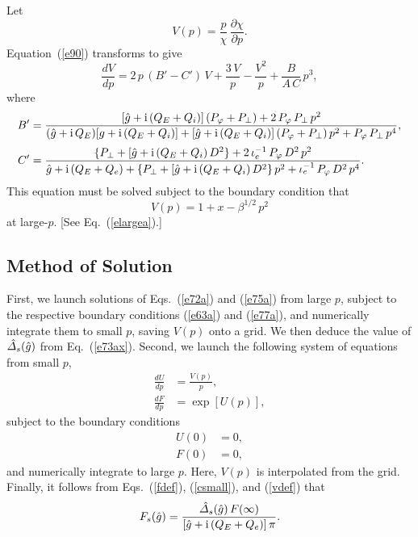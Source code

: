 \documentclass[12pt,prb,aps]{revtex4-1}
\begin{document}
Let 
\begin{equation}\label{vdef}
V(p)= \frac{p}{\chi}\,\frac{\partial\chi}{\partial p}.
\end{equation}
Equation~(\ref{e90}) transforms to give 
\begin{equation}\label{e75a}
\frac{dV}{dp} = 2\,p\,(B'-C')\,V + \frac{3\,V}{p} - \frac{V^2}{p} + \frac{B}{A\,C}\,p^3,
\end{equation}
where 
\begin{align}
B' &= \frac{ [\hat{g}+{\rm i}\,(Q_E+Q_i)]\,(P_\varphi+P_\perp)+ 2\,P_\varphi\,P_\perp\,p^2}{ (\hat{g}+{\rm i}\,Q_E)[g+{\rm i}\,(Q_E+Q_i)] + [\hat{g}+{\rm i}\,(Q_E+Q_i)]\,(P_\varphi+P_\perp)\,p^2+ P_\varphi\,P_\perp\,p^4},\\[0.5ex]
C'&=\frac{\{P_\perp + [\hat{g}+{\rm i}\,(Q_E+Q_i)\,D^2\}+ 2\,\iota_e^{-1}\,P_\varphi\,D^2\,p^2}{\hat{g} + {\rm i}\,(Q_E+Q_e) +\{P_\perp + [\hat{g}+{\rm i}\,(Q_E+Q_i)\,D^2\}\,p^2 + \iota_e^{-1}\,P_\varphi\,D^2\,p^4}.
\end{align}
This equation must be solved subject to the boundary condition that
\begin{equation}\label{e77a}
V(p) = 1+x-\beta^{1/2}\,p^2
\end{equation}
at large-$p$. [See Eq.~(\ref{elargea}).] 

\subsection{Method of Solution}
First, we launch solutions of Eqs.~(\ref{e72a}) and (\ref{e75a}) from large $p$, subject to the respective boundary conditions (\ref{e63a}) and (\ref{e77a}), and
numerically integrate them to small $p$,  saving $V(p)$ onto a grid. We then deduce the value of $\hat{\mit\Delta}_s(\hat{g})$ from Eq.~(\ref{e73ax}). 
Second, we launch the following system of equations from small $p$, 
\begin{align}
\frac{dU}{dp} &= \frac{V(p)}{p},\\[0.5ex]
\frac{dF}{dp} &=\exp[U(p)],
\end{align}
subject to the boundary conditions
\begin{align}
U(0) &=0,\\[0.5ex]
F(0) &= 0,
\end{align}
and numerically  integrate to large $p$. Here, $V(p)$ is interpolated from the grid. 
Finally,  it follows from Eqs.~(\ref{fdef}), (\ref{csmall}), and (\ref{vdef}) that 
\begin{equation}
F_s(\hat{g}) = \frac{\hat{\mit\Delta}_s(\hat{g})\,F(\infty)}{[\hat{g}+{\rm i}\,(Q_E+Q_e)]\,\pi}.
\end{equation}
\end{document}
